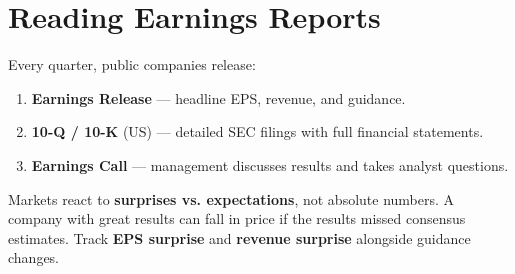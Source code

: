 \section{Reading Earnings Reports}

Every quarter, public companies release:
\begin{enumerate}
  \item \textbf{Earnings Release} — headline EPS, revenue, and guidance.
  \item \textbf{10-Q / 10-K} (US) — detailed SEC filings with full financial statements.
  \item \textbf{Earnings Call} — management discusses results and takes analyst questions.
\end{enumerate}

\begin{notebox}
Markets react to \textbf{surprises vs. expectations}, not absolute numbers. A company with
great results can fall in price if the results missed consensus estimates. Track
\textbf{EPS surprise} and \textbf{revenue surprise} alongside guidance changes.
\end{notebox}
